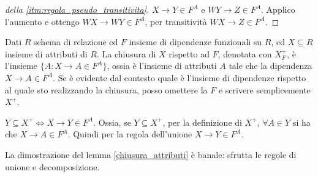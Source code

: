 \begin{proof}[della \ref{itm:regola_pseudo_transitivita}]
$X \to Y \in F^A$ e $WY \to Z \in F^A$. Applico l'aumento e ottengo $WX \to WY \in F^A$, per transitivit\`a $WX \to Z \in F^A$.
\end{proof}

\begin{defn}
Dati $R$ schema di relazione ed $F$ insieme di dipendenze funzionali su $R$, ed $X \subseteq R$ insieme di attributi di $R$. La chiusura di $X$ rispetto ad $F$, denotata con $X_F^+$, \`e l'insieme $ \{ A : X \to A \in F^A\}$, ossia \`e l'insieme di attributi $A$ tale che la dipendenza $X \to A \in F^A$. Se \`e evidente dal contesto quale \`e l'insieme di dipendenze rispetto al quale sto realizzando la chiusura, posso omettere la $F$ e scrivere semplicemente $X^+$.
\begin{lem}\label{chiusura_attributi}
$Y \subseteq X^+ \iff X \to Y \in F^A$. Ossia, se $Y \subseteq X^+$, per la definizione di $X^+$, $\forall A \in Y$ si ha che $X \to A \in F^A$. Quindi per la regola dell'unione $X \to Y \in F^A$.
\end{lem}
\end{defn}
La dimostrazione del lemma \ref{chiusura_attributi} \`e banale: sfrutta le regole di unione e decomposizione.

